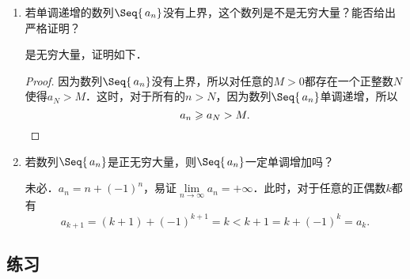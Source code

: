 \begin{enumerate}
\item 若单调递增的数列\(\Seq{\,a_n}\)没有上界，这个数列是不是无穷大量？能否给出严格证明？

  \ifshowsolp
    是无穷大量，证明如下．

    \begin{proof}
      因为数列\(\Seq{\,a_n}\)没有上界，所以对任意的\(M > 0\)都存在一个正整数\(N\)使得\(a_N > M\)．这时，对于所有的\(n > N\)，因为数列\(\Seq{\,a_n}\)单调递增，所以
      \begin{equation*}
        a_n \ge a_N > M. \qedhere
      \end{equation*}
    \end{proof}
  \fi

\item 若数列\(\Seq{\,a_n}\)是正无穷大量，则\(\Seq{\,a_n}\)一定单调增加吗？

  \ifshowsolp
    未必．\(a_n = n + (-1)^n\)，易证\(\lim\limits_{n\to\infty} a_n = +\infty\)．此时，对于任意的正偶数\(k\)都有
    \begin{equation*}
      a_{k+1} = (k+1) + (-1)^{k+1} = k < k + 1 = k + (-1)^k = a_k.
    \end{equation*}
  \fi
\end{enumerate}

\ifshowex
{}
\subsection*{练习}

